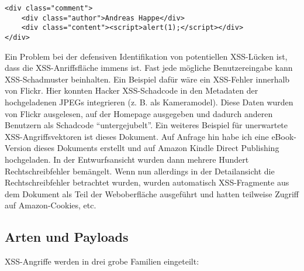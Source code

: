 \begin{verbatim}
<div class="comment">
	<div class="author">Andreas Happe</div>
	<div class="content"><script>alert(1);</script></div>
</div>
\end{verbatim}

Ein Problem bei der defensiven Identifikation von potentiellen XSS-Lücken ist, dass die XSS-Anriffsfläche immens ist. Fast jede mögliche Benutzereingabe kann XSS-Schadmuster beinhalten. Ein Beispiel dafür wäre ein XSS-Fehler innerhalb von Flickr. Hier konnten Hacker XSS-Schadcode in den Metadaten der hochgeladenen JPEGs integrieren (z. B. als Kameramodel). Diese Daten wurden von Flickr ausgelesen, auf der Homepage ausgegeben und dadurch anderen Benutzern als Schadcode ``untergejubelt''. Ein weiteres Beispiel für unerwartete XSS-Angriffsvektoren ist dieses Dokument. Auf Anfrage hin habe ich eine eBook-Version dieses Dokuments erstellt und auf Amazon Kindle Direct Publishing hochgeladen. In der Entwurfsansicht wurden dann mehrere Hundert Rechtschreibfehler bemängelt. Wenn nun allerdings in der Detailansicht die Rechtschreibfehler betrachtet wurden, wurden automatisch XSS-Fragmente aus dem Dokument als Teil der Weboberfläche ausgeführt und hatten teilweise Zugriff auf Amazon-Cookies, etc.

\subsection{Arten und Payloads}

XSS-Angriffe werden in drei grobe Familien eingeteilt:


